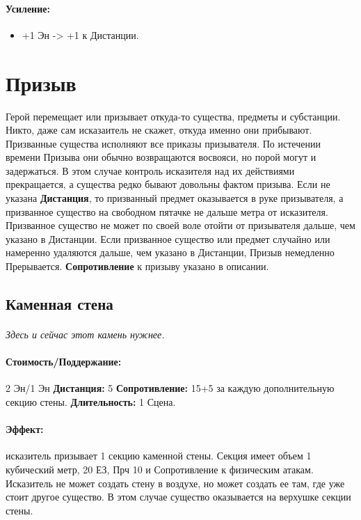 \begin{itemize}
\begin{itemize}
\paragraph{Усиление:}
\begin{itemize}
\item+1 Эн -> +1 к Дистанции.
\end{itemize}
\section{Призыв}Герой перемещает или призывает откуда-то существа, предметы и субстанции. Никто, даже сам исказаитель не скажет, откуда именно они прибывают.
\newline Призванные существа исполняют все приказы призывателя. По истечении времени Призыва они обычно возвращаются восвояси, но порой могут и задержаться. В этом случае контроль исказителя над их действиями прекращается, а существа редко бывают довольны фактом призыва.
\newline Если не указана 
\textbf{Дистанция}, то призванный предмет оказывается в руке призывателя, а призванное существо на свободном пятачке не дальше метра от исказителя. Призванное существо не может по своей воле отойти от призывателя дальше, чем указано в Дистанции. Если призванное существо или предмет случайно или намеренно удаляются дальше, чем указано в Дистанции, Призыв немедленно Прерывается.
\newline 
\textbf{Сопротивление} к призыву указано в описании.
\subsection{Каменная стена}
\paragraph{} 
\textit{
\tbd Здесь и сейчас этот камень нужнее.}
\paragraph{Стоимость/Поддержание: }2 Эн/1 Эн
\newline
\textbf{Дистанция: }5
\newline
\textbf{Сопротивление: }15+5 за каждую дополнительную секцию стены.
\newline 
\textbf{Длительность: }1 Сцена.
\paragraph{Эффект: }исказитель призывает 1 секцию каменной стены. Секция имеет объем 1 кубический метр, 20 ЕЗ, Прч 10 и Сопротивление к физическим атакам. Исказитель не может создать стену в воздухе, но может создать ее там, где уже стоит другое существо. В этом случае существо оказывается на верхушке секции стены.

\end{itemize}
\end{itemize}
